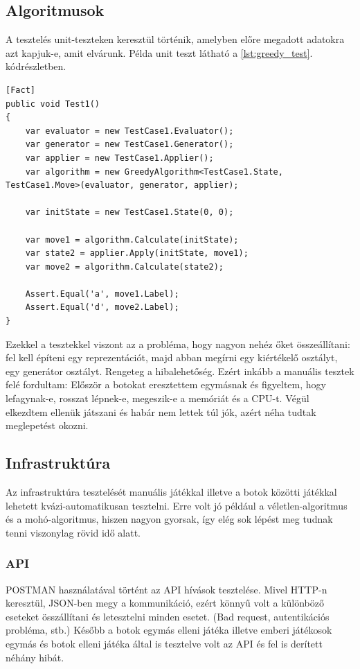 \documentclass[twoside, a4paper, 12pt]{article}
\begin{document}
\subsection{Algoritmusok}
A tesztelés unit-teszteken keresztül történik, amelyben előre megadott adatokra azt kapjuk-e, amit elvárunk. Példa unit teszt látható a \ref{lst:greedy_test}. kódrészletben.

\begin{lstlisting}[caption=Mohó-algoritmus teszt, label=lst:greedy_test, float]
[Fact]
public void Test1()
{
	var evaluator = new TestCase1.Evaluator();
	var generator = new TestCase1.Generator();
	var applier = new TestCase1.Applier();
	var algorithm = new GreedyAlgorithm<TestCase1.State, TestCase1.Move>(evaluator, generator, applier);
	
	var initState = new TestCase1.State(0, 0);
	
	var move1 = algorithm.Calculate(initState);
	var state2 = applier.Apply(initState, move1);
	var move2 = algorithm.Calculate(state2);
	
	Assert.Equal('a', move1.Label);
	Assert.Equal('d', move2.Label);
}
\end{lstlisting}

Ezekkel a tesztekkel viszont az a probléma, hogy nagyon nehéz őket összeállítani: fel kell építeni egy reprezentációt, majd abban megírni egy kiértékelő osztályt, egy generátor osztályt. Rengeteg a hibalehetőség. Ezért inkább a manuális tesztek felé fordultam:
Először a botokat eresztettem egymásnak és figyeltem, hogy lefagynak-e, rosszat lépnek-e, megeszik-e a memóriát és a CPU-t. Végül elkezdtem ellenük játszani és habár nem lettek túl jók, azért néha tudtak meglepetést okozni.

\subsection{Infrastruktúra}
Az infrastruktúra tesztelését manuális játékkal illetve a botok közötti játékkal lehetett kvázi-automatikusan tesztelni. Erre volt jó például a véletlen-algoritmus és a mohó-algoritmus, hiszen nagyon gyorsak, így elég sok lépést meg tudnak tenni viszonylag rövid idő alatt.


\subsubsection{API}
POSTMAN használatával történt az API hívások tesztelése. Mivel HTTP-n keresztül, JSON-ben megy a kommunikáció, ezért könnyű volt a különböző eseteket összállítani és letesztelni minden esetet. (Bad request, autentikációs probléma, stb.) Később a botok egymás elleni játéka illetve emberi játékosok egymás és botok elleni játéka által is tesztelve volt az API és fel is derített néhány hibát.
\end{document}
